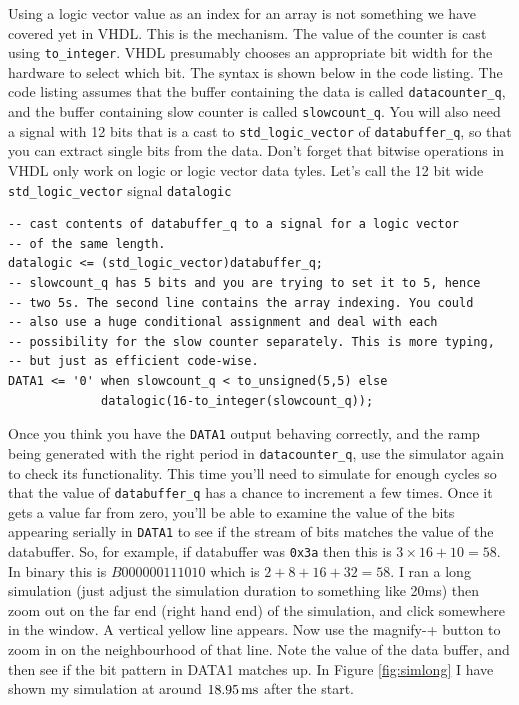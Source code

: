 \documentclass[../physical_computing.tex]{subfiles}
\begin{document}
Using a logic vector value as an index for an array is not something we have covered yet in VHDL. This is the mechanism. The value of the counter is cast using \texttt{to\_integer}. VHDL presumably chooses an appropriate bit width for the 
hardware to select which bit. The syntax is shown below in the code listing.
The code listing assumes that the buffer containing the data is called
\texttt{datacounter\_q}, and the buffer containing slow counter is called
\texttt{slowcount\_q}. You will also need a signal with 12 bits that is a 
cast to \texttt{std\_logic\_vector} of \texttt{databuffer\_q}, so that you can
extract single bits from the data. Don't forget that bitwise operations in VHDL
only work on logic or logic vector data tyles. Let's call the 12 bit wide
\texttt{std\_logic\_vector} signal \texttt{datalogic}

\begin{verbatim}
-- cast contents of databuffer_q to a signal for a logic vector 
-- of the same length.
datalogic <= (std_logic_vector)databuffer_q;
-- slowcount_q has 5 bits and you are trying to set it to 5, hence
-- two 5s. The second line contains the array indexing. You could
-- also use a huge conditional assignment and deal with each
-- possibility for the slow counter separately. This is more typing,
-- but just as efficient code-wise.
DATA1 <= '0' when slowcount_q < to_unsigned(5,5) else
             datalogic(16-to_integer(slowcount_q));
\end{verbatim}

Once you think you have the \texttt{DATA1} output behaving correctly, and the 
ramp being generated with the right period in \texttt{datacounter\_q}, use the
simulator again to check its functionality. This time you'll need to simulate
for enough cycles so that the value of \texttt{databuffer\_q} has a chance
to increment a few times. Once it gets a value far from zero, you'll be able to
examine the value of the bits appearing serially in \texttt{DATA1} to see if 
the stream of bits matches the value of the databuffer. So, for example, if
databuffer was \texttt{0x3a} then this is $3\times 16+10=58$. In binary this
is $B000000111010$ which is $2+8+16+32=58$. I ran a long simulation (just adjust
the simulation duration to something like 20ms) then zoom out on the far end
(right hand end) of the simulation, and click somewhere in the window. A vertical
yellow line appears. Now use the magnify-+ button to zoom in on the neighbourhood
of that line. Note the value of the data buffer, and then see if the bit pattern
in DATA1 matches up. In Figure \ref{fig:simlong} I have shown my simulation at around 
$\rm 18.95\,ms$ after the start.
\end{document}
